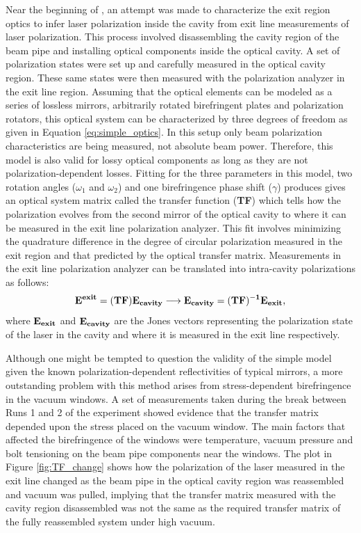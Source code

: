 Near the beginning of \Q, an attempt was made to characterize the exit region optics to infer laser polarization inside the cavity from exit line measurements of laser polarization. This process involved disassembling the cavity region of the beam pipe and installing optical components inside the optical cavity. A set of polarization states were set up and carefully measured in the optical cavity region. These same states were then measured with the polarization analyzer in the exit line region. Assuming that the optical elements can be modeled as a series of lossless mirrors, arbitrarily rotated birefringent plates and polarization rotators, this optical system can be characterized by three degrees of freedom as given in Equation \ref{eq:simple_optics}. In this setup only beam polarization characteristics are being measured, not absolute beam power. Therefore, this model is also valid for lossy optical components as long as they are not polarization-dependent losses. Fitting for the three parameters in this model, two rotation angles ($\omega_{1}$ and $\omega_{2}$) and one birefringence phase shift ($\gamma$) produces gives an optical system matrix called the transfer function ({\bf TF}) which tells how the polarization evolves from the second mirror of the optical cavity to where it can be measured in the exit line polarization analyzer. This fit involves minimizing the quadrature difference in the degree of circular polarization measured in the exit region and that predicted by the optical transfer matrix. Measurements in the exit line polarization analyzer can be translated into intra-cavity polarizations as follows:
\[
\bf E^{exit}=(TF)E_{cavity}\longrightarrow E_{cavity}=(TF)^{-1}E_{exit},
\]
where ${\bf E_{exit}}$ and ${\bf E_{cavity}}$ are the Jones vectors representing the polarization state of the laser in the cavity and where it is measured in the exit line respectively. 

Although one might be tempted to question the validity of the simple model given the known polarization-dependent reflectivities of typical mirrors, a more outstanding problem with this method arises from stress-dependent birefringence in the vacuum windows. A set of measurements taken during the break between Runs 1 and 2 of the \Qs experiment showed evidence that the transfer matrix depended upon the stress placed on the vacuum window. The main factors that affected the birefringence of the windows were temperature, vacuum pressure and bolt tensioning on the beam pipe components near the windows. The plot in Figure \ref{fig:TF_change} shows how the polarization of the laser measured in the exit line changed as the beam pipe in the optical cavity region was reassembled and vacuum was pulled, implying that the transfer matrix measured with the cavity region disassembled was not the same as the required transfer matrix of the fully reassembled system under high vacuum. 

